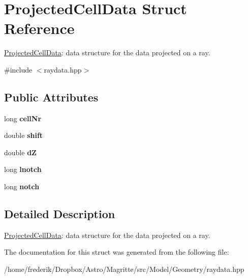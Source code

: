 \hypertarget{structProjectedCellData}{}\section{Projected\+Cell\+Data Struct Reference}
\label{structProjectedCellData}


\mbox{\hyperlink{structProjectedCellData}{Projected\+Cell\+Data}}\+: data structure for the data projected on a ray.  




{\ttfamily \#include $<$raydata.\+hpp$>$}

\subsection*{Public Attributes}
\begin{DoxyCompactItemize}
\item 
\mbox{\label{structProjectedCellData_a13fdb833344863717d217129ec398f2e}} 
long {\bfseries cell\+Nr}
\item 
\mbox{\label{structProjectedCellData_ab311bd5ac07266244dc820384dc15ad9}} 
double {\bfseries shift}
\item 
\mbox{\label{structProjectedCellData_a6f6743f346f2e10a0ae08fc826850575}} 
double {\bfseries dZ}
\item 
\mbox{\label{structProjectedCellData_a69e758a7e32926d242edcc31c5e49d82}} 
long {\bfseries lnotch}
\item 
\mbox{\label{structProjectedCellData_aba13abdae8f496ef0dfffefc5c19b64f}} 
long {\bfseries notch}
\end{DoxyCompactItemize}


\subsection{Detailed Description}
\mbox{\hyperlink{structProjectedCellData}{Projected\+Cell\+Data}}\+: data structure for the data projected on a ray. 

The documentation for this struct was generated from the following file\+:\begin{DoxyCompactItemize}
\item 
/home/frederik/\+Dropbox/\+Astro/\+Magritte/src/\+Model/\+Geometry/raydata.\+hpp\end{DoxyCompactItemize}
